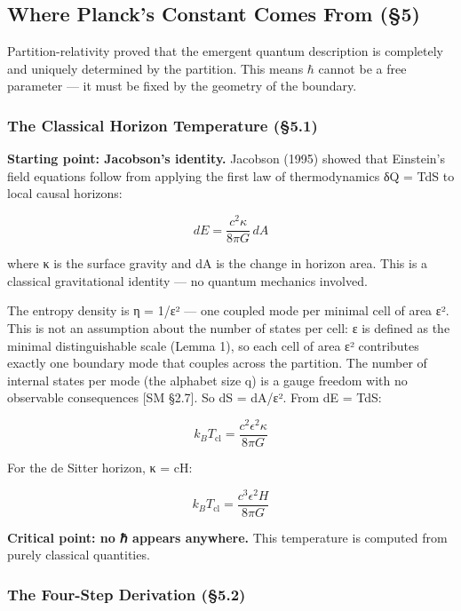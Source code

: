 \documentclass[
]{article}
\begin{document}
\hypertarget{where-plancks-constant-comes-from-5}{%
\subsection{Where Planck's Constant Comes From
(§5)}\label{where-plancks-constant-comes-from-5}}

Partition-relativity proved that the emergent quantum description is
completely and uniquely determined by the partition. This means
\(\hbar\) cannot be a free parameter --- it must be fixed by the
geometry of the boundary.

\hypertarget{the-classical-horizon-temperature-5.1}{%
\subsubsection{The Classical Horizon Temperature
(§5.1)}\label{the-classical-horizon-temperature-5.1}}

\textbf{Starting point: Jacobson's identity.} Jacobson (1995) showed
that Einstein's field equations follow from applying the first law of
thermodynamics δQ = TdS to local causal horizons:

\[dE = \frac{c^2 \kappa}{8\pi G} \, dA\]

where κ is the surface gravity and dA is the change in horizon area.
This is a classical gravitational identity --- no quantum mechanics
involved.

The entropy density is η = 1/ε² --- one coupled mode per minimal cell of
area ε². This is not an assumption about the number of states per cell:
ε is defined as the minimal distinguishable scale (Lemma 1), so each
cell of area ε² contributes exactly one boundary mode that couples
across the partition. The number of internal states per mode (the
alphabet size q) is a gauge freedom with no observable consequences
{[}SM §2.7{]}. So dS = dA/ε². From dE = TdS:

\[k_B T_{\text{cl}} = \frac{c^2 \epsilon^2 \kappa}{8\pi G}\]

For the de Sitter horizon, κ = cH:

\[k_B T_{\text{cl}} = \frac{c^3 \epsilon^2 H}{8\pi G}\]

\textbf{Critical point: no ℏ appears anywhere.} This temperature is
computed from purely classical quantities.

\hypertarget{the-four-step-derivation-5.2}{%
\subsubsection{The Four-Step Derivation
(§5.2)}\label{the-four-step-derivation-5.2}}
\end{document}
